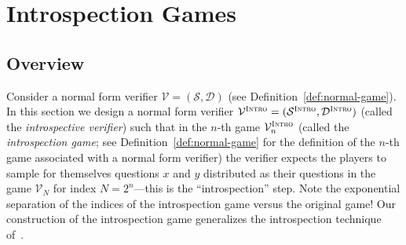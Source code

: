 \documentclass[11pt]{article}
\theoremstyle{definition}
\newcommand{\sampler}{\mathcal{S}}
\newcommand{\decider}{\mathcal{D}}
\newcommand{\verifier}{\mathcal{V}}
\newcommand{\gamestyle}[1]{\ensuremath{\textsc{#1}}\xspace}
\newcommand{\intro}{\gamestyle{Intro}}
\newcommand{\typestyle}[1]{\ensuremath{\textsc{#1}}\xspace}
\newcommand{\Sample}{\typestyle{Sample}}
\newcommand{\Read}{\typestyle{Read}}
\newcommand{\Hide}[1]{\typestyle{Hide}_{#1}}
\newcommand{\Intro}{\typestyle{Intro}}
\begin{document}
\section{Introspection Games}
\label{sec:introspection}

\newcommand{\ai}[1][y,\, a]{A^\Intro_{#1}}
\newcommand{\bs}[1][z,\, a]{B^\Sample_{#1}}
\newcommand{\br}[1][y,y^\perp, a]{B^\Read_{#1}}
\newcommand{\ahk}[1][y_{<k}]{A^{\Hide{k}}_{#1}}
\newcommand{\ahp}[1][y_{\le k}]{A^{\Hide{k+1}}_{#1}}
\newcommand{\bhk}[1][y_{<k}]{B^{\Hide{k}}_{#1}}
\newcommand{\bhp}[1][y_{\le k}]{B^{\Hide{k+1}}_{#1}}
\newcommand{\z}[1][z]{\sigma^Z_{#1}}
\newcommand{\x}[1][x]{\sigma^X_{#1}}

\newcommand{\La}{[L(\cdot) = y]}
\newcommand{\Lk}[1][k]{[L_{#1,\, y_{<#1}}(\cdot) = y_{#1}]}
\newcommand{\Llk}[1][k]{[L_{<#1}(\cdot) = y_{<#1}]}
\newcommand{\Llek}[1][k]{[L_{\le #1}(\cdot) = y_{\le #1}]}
\newcommand{\Lperpk}[1][k]{[L_{#1,\, y_{<#1}}^\perp (\cdot) = y_{#1}^\perp]}

\newcommand{\aigek}[1][y_{\ge k},\, a]{A^{\Intro,\, y_{<k}}_{#1}}
\newcommand{\aigk}[1][y_{> k},\, a]{A^{\Intro,\, y_{\le k}}_{#1}}
\newcommand{\bsL}{\bs[\La,\, a]}
\newcommand{\zL}{\z[\La]}
\newcommand{\zLk}[1][k]{\sigma^{Z}_{\Lk[#1]}}
\newcommand{\zLlk}[1][k]{\z[{\Llk[#1]}]}
\newcommand{\zLlek}{\z[\Llek]}
\newcommand{\xLperpk}[1][k]{\sigma^{X}_{\Lperpk[#1]}}

\newcommand{\aizk}[1][y,\, a]{A^{\Intro,\, Z_{<k}}_{#1}}

\subsection{Overview}
\label{sec:intro-overview}

Consider a normal form verifier $\verifier = (\sampler, \decider)$ (see
Definition~\ref{def:normal-game}).
In this section we design a normal form verifier $\verifier^\intro =
(\sampler^\intro, \decider^\intro)$ (called the \emph{introspective verifier})
such that in the $n$-th game $\verifier^\intro_n$ (called the
\emph{introspection game}; see Definition~\ref{def:normal-game} for the
definition of the $n$-th game associated with a normal form verifier) the
verifier expects the players to sample for themselves questions $x$ and $y$
distributed as their questions in the game $\verifier_N$ for index $N =
2^n$---this is the ``introspection'' step.
Note the exponential separation of the indices of the introspection game versus
the original game!
Our construction of the introspection game generalizes the introspection
technique of~\cite{NW19}.
\end{document}
